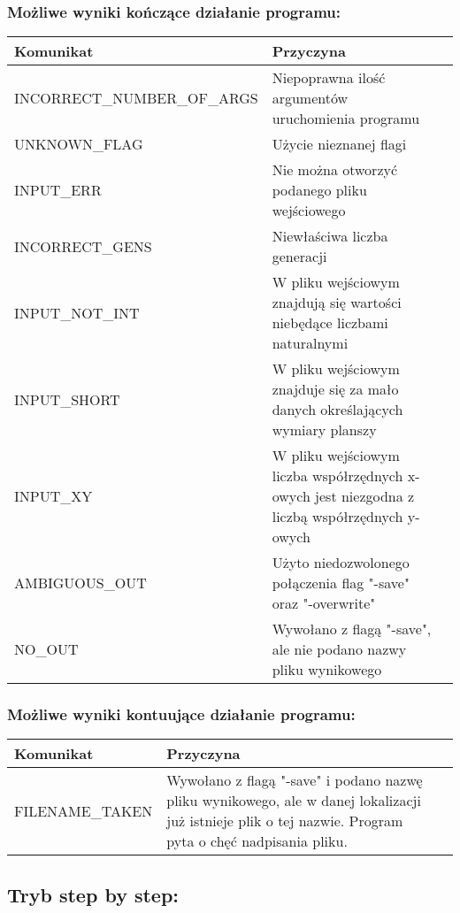 \documentclass[11pt,a4paper]{report}
\begin{document}
\subsubsection {Możliwe wyniki kończące działanie programu:}
\begin{tabularx}{\textwidth}{  X|Xl  }
 \hline
 Komunikat                                   					& Przyczyna\\
 \hline \hline
			INCORRECT\_NUMBER\_OF\_ARGS	&Niepoprawna ilość argumentów uruchomienia programu\\
 \hline
			UNKNOWN\_FLAG	 			&Użycie nieznanej flagi\\
 \hline
			INPUT\_ERR					&Nie można otworzyć podanego pliku wejściowego\\
 \hline
			INCORRECT\_GENS				&Niewłaściwa liczba generacji\\
 \hline
			INPUT\_NOT\_INT				&W pliku wejściowym znajdują się wartości niebędące liczbami naturalnymi\\
 \hline
			INPUT\_SHORT				&W pliku wejściowym znajduje się za mało danych określających wymiary planszy\\
 \hline
			INPUT\_XY					&W pliku wejściowym liczba współrzędnych x-owych jest niezgodna z liczbą współrzędnych y-owych\\
\hline
			AMBIGUOUS\_OUT				&Użyto niedozwolonego połączenia flag "-save" oraz "-overwrite"\\
 \hline
			NO\_OUT					&Wywołano z flagą "-save", ale nie podano nazwy pliku wynikowego\\
 \hline
\end{tabularx}

\subsubsection{Możliwe wyniki kontuujące działanie programu:}
\begin{tabularx}{\textwidth}{  X|Xl  }
\hline
   Komunikat                                    				& Przyczyna\\
\hline \hline
			FILENAME\_TAKEN				&Wywołano z flagą "-save" i podano nazwę pliku wynikowego, ale w danej lokalizacji już istnieje plik o tej nazwie. Program pyta o chęć nadpisania pliku.\\
\hline
\end{tabularx}

\subsection[Tryb step by step] {Tryb step by step:}
\end{document}

